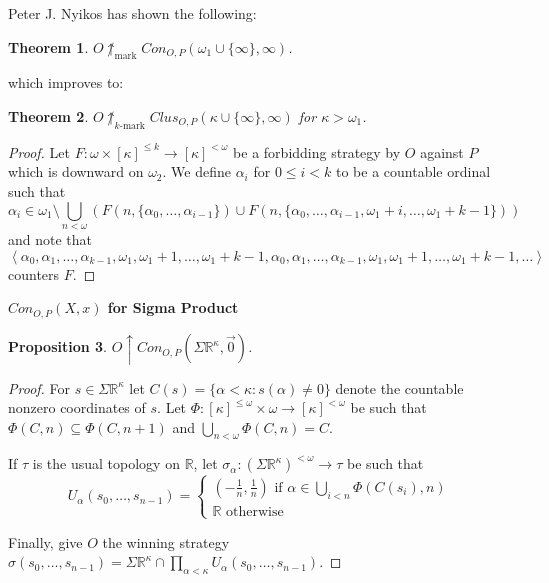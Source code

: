 \documentclass[11pt]{article}
\theoremstyle{plain}
\newtheorem{theorem}{Theorem}
\newtheorem{proposition}[theorem]{Proposition}
\theoremstyle{definition}
\theoremstyle{remark}
\newcommand{\markwin}{\uparrow_{\text{mark}}}
\newcommand{\kmarkwin}[1]{\uparrow_{#1\text{-mark}}}
\newcommand{\congame}[2]{Con_{O,P}(#1,#2)}
\newcommand{\sigmaprodr}[1]{\Sigma\mathbb{R}^{#1}}
\begin{document}
Peter J. Nyikos has shown the following:

\begin{theorem}
$O\not\markwin Con_{O,P}(\omega_1\cup\{\infty\},\infty)$.
\end{theorem}

which improves to:

\begin{theorem}
$O\not\kmarkwin{k}Clus_{O,P}(\kappa\cup\{\infty\},\infty)$ for $\kappa>\omega_1$.
\end{theorem}

\begin{proof}
Let $F:\omega \times [\kappa]^{\leq k} \to [\kappa]^{<\omega}$ be a forbidding strategy by $O$ against $P$ which is downward on $\omega_2$. We define $\alpha_i$ for $0\leq i < k$ to be a countable ordinal such that \[ \alpha_i \in \omega_1 \setminus\bigcup_{n<\omega}\left(F(n,\{\alpha_0,\dots,\alpha_{i-1}\}) \cup F(n,\{\alpha_0,\dots,\alpha_{i-1},\omega_1+i,\dots,\omega_1+k-1\})\right)\] and note that \[\left<\alpha_0,\alpha_1,\dots,\alpha_{k-1},\omega_1,\omega_1+1,\dots,\omega_1+k-1,\alpha_0,\alpha_1,\dots,\alpha_{k-1},\omega_1,\omega_1+1,\dots,\omega_1+k-1,\dots\right>\] counters $F$.
\end{proof}

\centerline{\bf $Con_{O,P}(X,x)$ for Sigma Product}

\begin{proposition}
$O\uparrow\congame{\sigmaprodr{\kappa}}{\vec{0}}$.
\end{proposition}

\begin{proof}
For $s\in\sigmaprodr{\kappa}$ let $C(s)=\{\alpha<\kappa:s(\alpha)\not=0\}$ denote the countable nonzero coordinates of $s$. Let $\Phi:[\kappa]^{\leq\omega}\times\omega\to[\kappa]^{<\omega}$ be such that $\Phi(C,n)\subseteq\Phi(C,n+1)$ and $\bigcup_{n<\omega}\Phi(C,n)=C$.

If $\tau$ is the usual topology on $\mathbb{R}$, let $\sigma_\alpha:(\sigmaprodr{\kappa})^{<\omega}\to\tau$ be such that
\[
U_\alpha(s_0,\dots,s_{n-1})=\left\{
\begin{array}{l}
(-\frac{1}{n},\frac{1}{n}) \text{ if } \alpha\in\bigcup_{i<n}\Phi(C(s_i),n) \\
\mathbb{R} \text{ otherwise}
\end{array}
\right.
\]

Finally, give $O$ the winning strategy $\sigma(s_0,\dots,s_{n-1})=\sigmaprodr{\kappa}\cap\prod_{\alpha<\kappa}U_\alpha(s_0,\dots,s_{n-1})$.
\end{proof}
\end{document}
